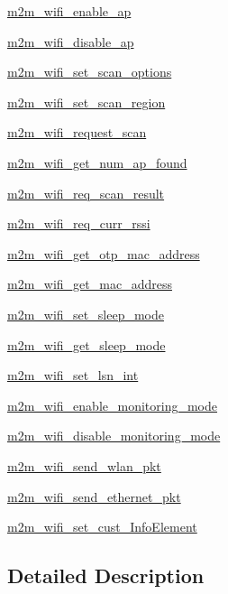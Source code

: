 \begin{DoxyCompactItemize}
\hyperlink{group__WifiEnableApFn}{m2m\+\_\+wifi\+\_\+enable\+\_\+ap}
\item 
\hyperlink{group__WifiDisableApFn}{m2m\+\_\+wifi\+\_\+disable\+\_\+ap}
\item 
\hyperlink{group__WifiSetScanOptionFn}{m2m\+\_\+wifi\+\_\+set\+\_\+scan\+\_\+options}
\item 
\hyperlink{group__WifiSetScanRegionFn}{m2m\+\_\+wifi\+\_\+set\+\_\+scan\+\_\+region}
\item 
\hyperlink{group__WifiRequestScanFn}{m2m\+\_\+wifi\+\_\+request\+\_\+scan}
\item 
\hyperlink{group__WifiGetNumAPFoundFn}{m2m\+\_\+wifi\+\_\+get\+\_\+num\+\_\+ap\+\_\+found}
\item 
\hyperlink{group__WifiReqScanResult}{m2m\+\_\+wifi\+\_\+req\+\_\+scan\+\_\+result}
\item 
\hyperlink{group__WifiReqCurrentRssiFn}{m2m\+\_\+wifi\+\_\+req\+\_\+curr\+\_\+rssi}
\item 
\hyperlink{group__WifiGetOtpMacAddFn}{m2m\+\_\+wifi\+\_\+get\+\_\+otp\+\_\+mac\+\_\+address}
\item 
\hyperlink{group__WifiGetMacAddFn}{m2m\+\_\+wifi\+\_\+get\+\_\+mac\+\_\+address}
\item 
\hyperlink{group__SetSleepModeFn}{m2m\+\_\+wifi\+\_\+set\+\_\+sleep\+\_\+mode}
\item 
\hyperlink{group__GetSleepModeFn}{m2m\+\_\+wifi\+\_\+get\+\_\+sleep\+\_\+mode}
\item 
\hyperlink{group__WifiSetLsnIntFn}{m2m\+\_\+wifi\+\_\+set\+\_\+lsn\+\_\+int}
\item 
\hyperlink{group__WifiEnableMonitorModeFn}{m2m\+\_\+wifi\+\_\+enable\+\_\+monitoring\+\_\+mode}
\item 
\hyperlink{group__WifiDisableMonitorModeFn}{m2m\+\_\+wifi\+\_\+disable\+\_\+monitoring\+\_\+mode}
\item 
\hyperlink{group__SendWlanPktFn}{m2m\+\_\+wifi\+\_\+send\+\_\+wlan\+\_\+pkt}
\item 
\hyperlink{group__WifiSendEthernetPktFn}{m2m\+\_\+wifi\+\_\+send\+\_\+ethernet\+\_\+pkt}
\item 
\hyperlink{group__WifiSetCustInfoElementFn}{m2m\+\_\+wifi\+\_\+set\+\_\+cust\+\_\+\+Info\+Element}
\end{DoxyCompactItemize}


\subsection{Detailed Description}
